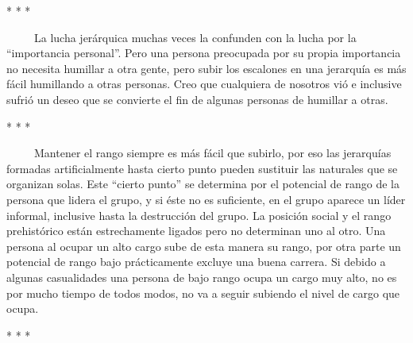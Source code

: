 \begin{center}
 *  *  * 
\end{center}

~ ~ ~ La lucha jerárquica muchas veces la confunden con la lucha por la
``importancia personal''. Pero una persona preocupada por su propia
importancia no necesita humillar a otra gente, pero subir los escalones
en una jerarquía es más fácil humillando a otras personas. Creo que
cualquiera de nosotros vió e inclusive sufrió un deseo que se convierte
el fin de algunas personas de humillar a otras.

\begin{center}
 *  *  * 
\end{center}

~ ~ ~ Mantener el rango siempre es más fácil que subirlo, por eso las
jerarquías formadas artificialmente hasta cierto punto pueden sustituir
las naturales que se organizan solas. Este ``cierto punto'' se determina
por el potencial de rango de la persona que lidera el grupo, y si éste
no es suficiente, en el grupo aparece un líder informal, inclusive hasta
la destrucción del grupo. La posición social y el rango prehistórico
están estrechamente ligados pero no determinan uno al otro. Una persona
al ocupar un alto cargo sube de esta manera su rango, por otra parte un
potencial de rango bajo prácticamente excluye una buena carrera. Si
debido a algunas casualidades una persona de bajo rango ocupa un cargo
muy alto, no es por mucho tiempo de todos modos, no va a seguir subiendo
el nivel de cargo que ocupa.

\begin{center}
 *  *  * 
\end{center}

